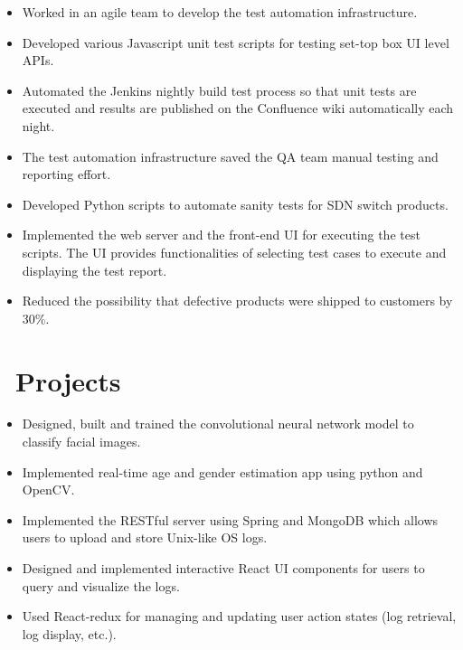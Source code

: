 \documentclass{resume}
\begin{document}
\begin{itemize}
	\item Worked in an agile team to develop the test automation infrastructure.
	\item Developed various Javascript unit test scripts for testing set-top box UI level APIs.
	\item Automated the Jenkins nightly build test process so that unit tests are executed and results are published on the Confluence wiki automatically each night.
	\item The test automation infrastructure saved the QA team manual testing and reporting effort.
\end{itemize}

\begin{itemize}
	\item Developed Python scripts to automate sanity tests for SDN switch products.
	\item Implemented the web server and the front-end UI for executing the test scripts. The UI provides functionalities of selecting test cases to execute and displaying the test report.
	\item Reduced the possibility that defective products were shipped to customers by 30\%.
\end{itemize}

\section{\faUsers\ Projects}
\begin{itemize}
	\item Designed, built and trained the convolutional neural network model to classify facial images.
	\item Implemented real-time age and gender estimation app using python and OpenCV. 
\end{itemize}

\begin{itemize}
	\item Implemented the RESTful server using Spring and MongoDB which allows users to upload and store Unix-like OS logs.
	\item Designed and implemented interactive React UI components for users to query and visualize the logs. 
	\item Used React-redux for managing and updating user action states (log retrieval, log display, etc.).
\end{itemize}

%
%
\end{document}
